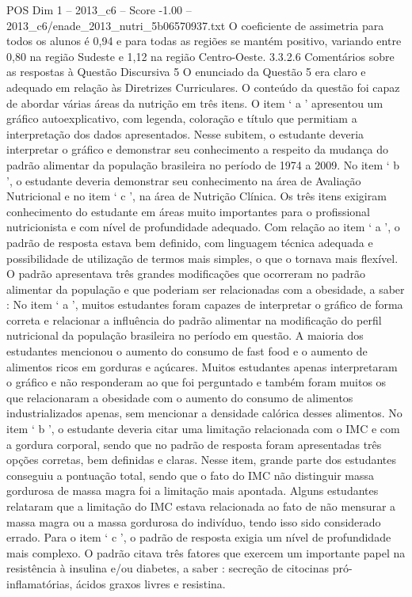 \begin{textsample}{POS Dim 1 – 2013\_c6 – Score -1.00 – 2013\_c6/enade\_2013\_nutri\_5b06570937.txt}
O coeficiente de assimetria para todos os alunos é 0,94 e para todas as regiões se mantém positivo, variando entre 0,80 na região Sudeste e 1,12 na região Centro-Oeste. 3.3.2.6 Comentários sobre as respostas à Questão Discursiva 5 O enunciado da Questão 5 era claro e adequado em relação às Diretrizes Curriculares.
O conteúdo da questão foi capaz de abordar várias áreas da nutrição em três itens.
O item ‘ a ’ apresentou um gráfico autoexplicativo, com legenda, coloração e título que permitiam a interpretação dos dados apresentados.
Nesse subitem, o estudante deveria interpretar o gráfico e demonstrar seu conhecimento a respeito da mudança do padrão alimentar da população brasileira no período de 1974 a 2009.
No item ‘ b ’, o estudante deveria demonstrar seu conhecimento na área de Avaliação Nutricional e no item ‘ c ’, na área de Nutrição Clínica.
Os três itens exigiram conhecimento do estudante em áreas muito importantes para o profissional nutricionista e com nível de profundidade adequado.
Com relação ao item ‘ a ’, o padrão de resposta estava bem definido, com linguagem técnica adequada e possibilidade de utilização de termos mais simples, o que o tornava mais flexível.
O padrão apresentava três grandes modificações que ocorreram no padrão alimentar da população e que poderiam ser relacionadas com a obesidade, a saber : No item ‘ a ’, muitos estudantes foram capazes de interpretar o gráfico de forma correta e relacionar a influência do padrão alimentar na modificação do perfil nutricional da população brasileira no período em questão.
A maioria dos estudantes mencionou o aumento do consumo de fast food e o aumento de alimentos ricos em gorduras e açúcares.
Muitos estudantes apenas interpretaram o gráfico e não responderam ao que foi perguntado e também foram muitos os que relacionaram a obesidade com o aumento do consumo de alimentos industrializados apenas, sem mencionar a densidade calórica desses alimentos.
No item ‘ b ’, o estudante deveria citar uma limitação relacionada com o IMC e com a gordura corporal, sendo que no padrão de resposta foram apresentadas três opções corretas, bem definidas e claras.
Nesse item, grande parte dos estudantes conseguiu a pontuação total, sendo que o fato do IMC não distinguir massa gordurosa de massa magra foi a limitação mais apontada.
Alguns estudantes relataram que a limitação do IMC estava relacionada ao fato de não mensurar a massa magra ou a massa gordurosa do indivíduo, tendo isso sido considerado errado.
Para o item ‘ c ’, o padrão de resposta exigia um nível de profundidade mais complexo.
O padrão citava três fatores que exercem um importante papel na resistência à insulina e/ou diabetes, a saber : secreção de citocinas pró-inflamatórias, ácidos graxos livres e resistina.

\end{textsample}

